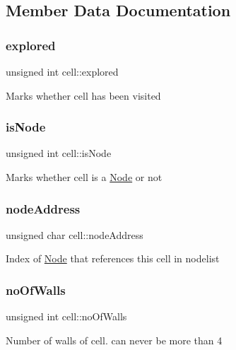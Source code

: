 \subsection{Member Data Documentation}
\mbox{\label{structcell_aefc3f7506ad8c2ad9f31e7d9ba093828}} 
\subsubsection{\texorpdfstring{explored}{explored}}
{\footnotesize\ttfamily unsigned int cell\+::explored}

Marks whether cell has been visited \mbox{\label{structcell_aaa0cb97f34f5d696c6d7f2ef154fbfc8}} 
\subsubsection{\texorpdfstring{is\+Node}{isNode}}
{\footnotesize\ttfamily unsigned int cell\+::is\+Node}

Marks whether cell is a \hyperlink{structNode}{Node} or not \mbox{\label{structcell_a0b372a9239a2ed20cde6edb427069bd8}} 
\subsubsection{\texorpdfstring{node\+Address}{nodeAddress}}
{\footnotesize\ttfamily unsigned char cell\+::node\+Address}

Index of \hyperlink{structNode}{Node} that references this cell in nodelist \mbox{\label{structcell_a8d23cc3f76831a9bcf536b77ba272848}} 
\subsubsection{\texorpdfstring{no\+Of\+Walls}{noOfWalls}}
{\footnotesize\ttfamily unsigned int cell\+::no\+Of\+Walls}

Number of walls of cell. can never be more than 4 \mbox{\label{structcell_a9a2929dcb308b9eb30f19cddebcc5c52}} 
